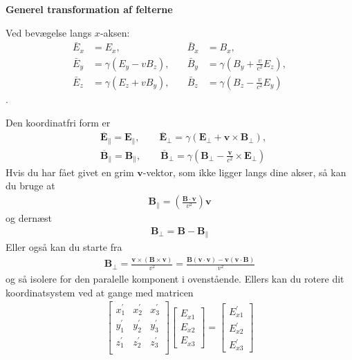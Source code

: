 \documentclass[a4paper]{article}
\begin{document}
    \textbf{Generel transformation af felterne}

    Ved bevægelse langs \(x\)-aksen:
    \begin{align*}
        \bar{E}_x &= E_x, \quad & \bar{B}_x &= B_x, \\
        \bar{E}_y &= \gamma \left( E_y - v B_z \right), \quad & \bar{B}_y &= \gamma \left( B_y + \frac{v}{c^2} E_z \right), \\
        \bar{E}_z &= \gamma \left( E_z + v B_y \right), \quad & \bar{B}_z &= \gamma \left( B_z - \frac{v}{c^2} E_y \right)\tag{12.111}
    \end{align*}
    . 
    
    Den koordinatfri form er \begin{align*}
        &\overline{\mathbf{E}}_{\parallel} =\mathbf{E}_{\parallel}, \qquad \overline{\mathbf{E}}_\perp = \gamma (\mathbf{E}_{\perp} + \mathbf{v} \times \mathbf{B}_\perp),\\
        &\overline{\mathbf{B}}_{\parallel} =\mathbf{B}_{\parallel}, \qquad \overline{\mathbf{B}}_\perp = \gamma (\mathbf{B}_{\perp} - \frac{\mathbf{v}}{c^{2} } \times \mathbf{E}_\perp) \tag{12.112}
    \end{align*}
    Hvis du har fået givet en grim \(\mathbf{v}\)-vektor, som ikke ligger langs dine akser, så kan du bruge at \begin{align*}
        \mathbf{B}_\parallel = \left(  \frac{\mathbf{B}\cdot \mathbf{v}}{v^{2} } \right) \mathbf{v}
    \end{align*} 
    og dernæst \begin{align*}
        \mathbf{B}_\perp = \mathbf{B} - \mathbf{B}_\parallel
    \end{align*}
    Eller også kan du starte fra \begin{align*}
        \mathbf{B}_\perp = \frac{\mathbf{v} \times \left( \mathbf{B} \times \mathbf{v} \right) }{v^{2} } = \frac{\mathbf{B}(\mathbf{v} \cdot \mathbf{v}) - \mathbf{v} (\mathbf{v} \cdot \mathbf{B})}{v^{2} }
    \end{align*}
    og så isolere for den paralelle komponent i ovenstående. Ellers kan du rotere dit koordinatsystem ved at gange med matricen \begin{align*}
        \begin{bmatrix}
            x^{\prime}_1 & x^{\prime} _2 & x^{\prime} _3\\
            y^{\prime}_1 & y^{\prime} _2 & y^{\prime} _3\\
            z^{\prime}_1 & z^{\prime} _2 & z^{\prime} _3\\
        \end{bmatrix} \begin{bmatrix}
            E_{x1} \\
            E_{x2} \\
            E_{x3}   
        \end{bmatrix} = \begin{bmatrix}
            E^{\prime} _{x1} \\
            E^{\prime} _{x2} \\
            E^{\prime} _{x3}   
        \end{bmatrix}
    \end{align*}
\end{document}

